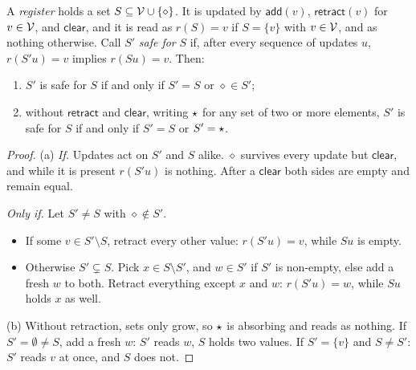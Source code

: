 \begin{lemma}\label{lem:register}
A \emph{register} holds a set $S \subseteq \mathcal{V} \cup \{\diamond\}$. It is updated by
$\mathsf{add}(v)$, $\mathsf{retract}(v)$ for $v \in \mathcal{V}$, and $\mathsf{clear}$, and it is read as
$r(S) = v$ if $S = \{v\}$ with $v \in \mathcal{V}$, and as nothing otherwise. Call $S'$ \emph{safe for} $S$ if,
after every sequence of updates $u$, $r(S'u) = v$ implies $r(Su) = v$. Then:
\begin{enumerate}
\item[(a)] $S'$ is safe for $S$ if and only if $S' = S$ or $\diamond \in S'$;
\item[(b)] without $\mathsf{retract}$ and $\mathsf{clear}$, writing $\star$ for any set of two or
  more elements, $S'$ is safe for $S$ if and only if $S' = S$ or $S' = \star$.
\end{enumerate}
\end{lemma}
\begin{proof}
(a) \emph{If.} Updates act on $S'$ and $S$ alike. $\diamond$ survives every update but
$\mathsf{clear}$, and while it is present $r(S'u)$ is nothing. After a $\mathsf{clear}$ both sides
are empty and remain equal.

\emph{Only if.} Let $S' \neq S$ with $\diamond \notin S'$.
\begin{itemize}
\item If some $v \in S' \setminus S$, retract every other value: $r(S'u) = v$, while $Su$ is empty.
\item Otherwise $S' \subsetneq S$. Pick $x \in S \setminus S'$, and $w \in S'$ if $S'$ is non-empty,
  else add a fresh $w$ to both. Retract everything except $x$ and $w$: $r(S'u) = w$, while $Su$
  holds $x$ as well.
\end{itemize}

(b) Without retraction, sets only grow, so $\star$ is absorbing and reads as nothing. If
$S' = \emptyset \neq S$, add a fresh $w$: $S'$ reads $w$, $S$ holds two values. If $S' = \{v\}$ and
$S \neq S'$: $S'$ reads $v$ at once, and $S$ does not.
\end{proof}

